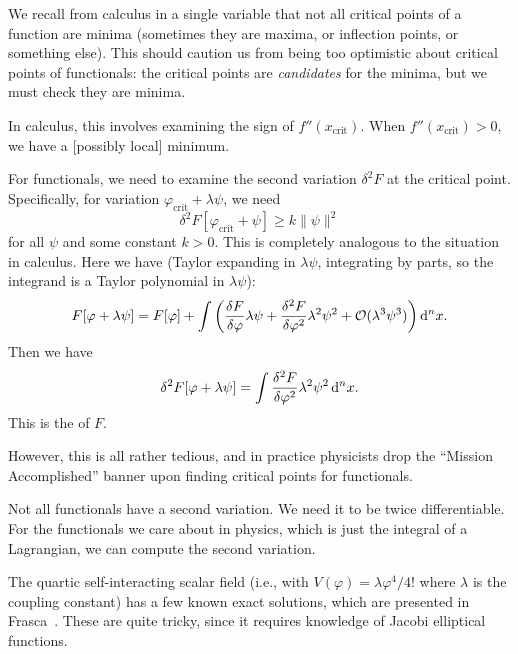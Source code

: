 We recall from calculus in a single variable that not all critical
points of a function are minima (sometimes they are maxima, or
inflection points, or something else). This should caution us from being
too optimistic about critical points of functionals: the critical points
are \emph{candidates} for the minima, but we must check they are minima.

In calculus, this involves examining the sign of
$f''(x_{\text{crit}})$. When $f''(x_{\text{crit}})>0$, we have a
[possibly local] minimum.

For functionals, we need to examine the second variation $\delta^{2}F$
at the critical point. Specifically, for variation $\varphi_{\text{crit}}+\lambda\psi$,
we need
\begin{equation}
\delta^{2}F[\varphi_{\text{crit}}+\psi]\geq k\|\psi\|^{2}
\end{equation}
for all $\psi$ and some constant $k>0$. This is completely analogous to
the situation in calculus. Here we have (Taylor expanding in $\lambda\psi$, integrating by parts,
so the integrand is a Taylor polynomial in $\lambda\psi$):
\begin{equation}
F[\varphi+\lambda\psi] = F[\varphi] + \int\left(\frac{\delta F}{\delta\varphi}\lambda\psi
+\frac{\delta^{2} F}{\delta\varphi^{2}}\lambda^{2}\psi^{2} + \mathcal{O}(\lambda^{3}\psi^{3})\right)\mathrm{d}^{n}x.
\end{equation}
Then we have 
\begin{equation}
\delta^{2}F[\varphi+\lambda\psi] = \int\frac{\delta^{2} F}{\delta\varphi^{2}}\lambda^{2}\psi^{2}\,\mathrm{d}^{n}x.
\end{equation}
This is the  of $F$.

However, this is all rather tedious, and in practice physicists drop the
``Mission Accomplished'' banner upon finding critical points for
functionals.

\begin{ddanger}
Not all functionals have a second variation. We need it to be twice
differentiable. For the functionals we care about in physics, which is
just the integral of a Lagrangian, we can compute the second variation.
\end{ddanger}

The quartic self-interacting scalar field (i.e., with
$V(\varphi)=\lambda\varphi^{4}/4!$ where $\lambda$ is the coupling
constant) has a few known exact solutions, which are presented in
Frasca~\cite{Frasca:2009bc}. These are quite tricky, since it requires
knowledge of Jacobi elliptical functions.
